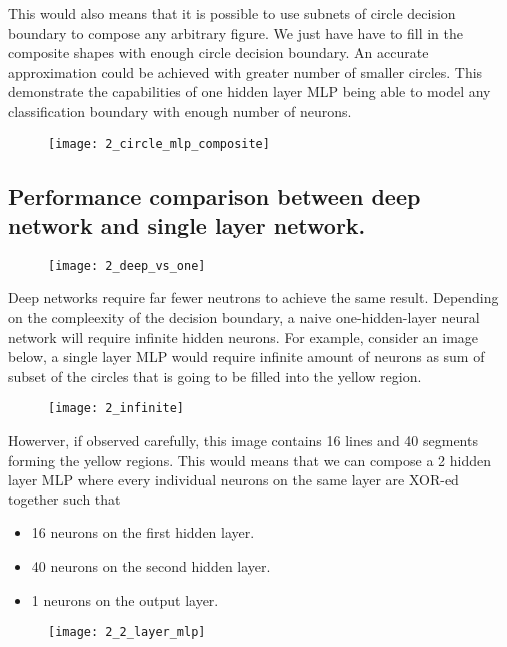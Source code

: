 \hfill\break
This would also means that it is possible to use subnets of circle decision boundary to compose any arbitrary figure. We just have have to fill in the composite shapes with enough circle decision boundary. An accurate approximation could be achieved with greater number of smaller circles. This demonstrate the capabilities of one hidden layer MLP being able to model any classification boundary with enough number of neurons.

\begin{figure}[H]
	\centering
	\texttt{[image: 2\_circle\_mlp\_composite]}
\end{figure}

\subsection{Performance comparison between deep network and single layer network.}
 
 \begin{figure}[H]
 	\centering
 	\texttt{[image: 2\_deep\_vs\_one]}
 \end{figure}
 
Deep networks require far fewer neutrons to achieve the same result. Depending on the compleexity of the decision boundary, a naive one-hidden-layer neural network will require infinite hidden neurons. For example, consider an image below, a single layer MLP would require infinite amount of neurons as sum of subset of the circles that is going to be filled into the yellow region.

 \begin{figure}[H]
	\centering
	\texttt{[image: 2\_infinite]}
\end{figure}

\hfill\break
Howerver, if observed carefully, this image contains 16 lines and 40 segments forming the yellow regions. This would means that we can compose a 2 hidden layer MLP  where every individual neurons on the same layer are XOR-ed together such that

\begin{itemize}
	\item 16 neurons on the first hidden layer.
	\item 40 neurons on the second hidden layer.
	\item 1 neurons on the output layer.
\end{itemize}

 \begin{figure}[H]
	\centering
	\texttt{[image: 2\_2\_layer\_mlp]}
\end{figure}

